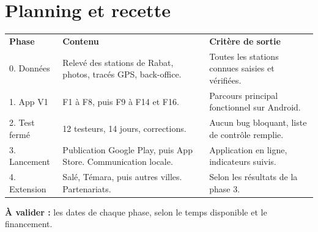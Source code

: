 \documentclass[11pt,a4paper]{article}
\newcommand{\hd}[1]{\textbf{\color{white}#1}}
\newcommand{\hdrow}{\rowcolor{brand}}
\newcommand{\valider}[1]{\begin{avalider}\textbf{À valider :} #1\end{avalider}}
\begin{document}
\Needspace{9cm}
\section{Planning et recette}
\begin{center}
\end{center}

\begin{xltabular}{\textwidth}{@{}l Y Y@{}}
\hdrow \hd{Phase} & \hd{Contenu} & \hd{Critère de sortie} \\
0. Données & Relevé des stations de Rabat, photos, tracés GPS, back-office. & Toutes les stations connues saisies et vérifiées. \\
1. App V1 & F1 à F8, puis F9 à F14 et F16. & Parcours principal fonctionnel sur Android. \\
2. Test fermé & 12 testeurs, 14 jours, corrections. & Aucun bug bloquant, liste de contrôle remplie. \\
3. Lancement & Publication Google Play, puis App Store. Communication locale. & Application en ligne, indicateurs suivis. \\
4. Extension & Salé, Témara, puis autres villes. Partenariats. & Selon les résultats de la phase 3. \\
\end{xltabular}
\valider{les dates de chaque phase, selon le temps disponible et le financement.}
\end{document}

